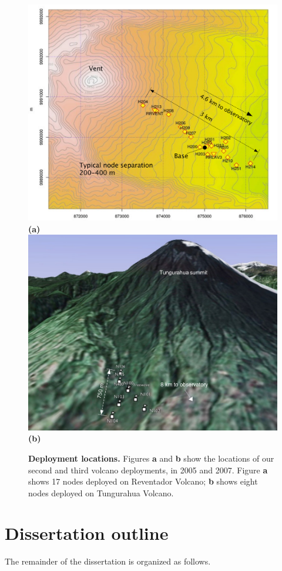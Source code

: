 \begin{figure}[]
\begin{center}
\includegraphics[width=1.0\hsize]{./figures/OSDI2006/2006-ReventadorMap.pdf}\\
\textbf{(a)}\\
\includegraphics[width=1.0\hsize]{./figures/Sensys2008/2008-deployment-map.pdf}\\
\textbf{(b)}
\end{center}
\caption{{\bf Deployment locations.}
Figures \textbf{a} and \textbf{b} show the locations of our second and third volcano
deployments, in 2005 and 2007. Figure \textbf{a} shows 17 nodes deployed on Reventador
Volcano; \textbf{b} shows eight nodes deployed on Tungurahua Volcano.}
\label{fig-deployment-maps}
\end{figure}


\section{Dissertation outline}

The remainder of the dissertation is organized as follows.

